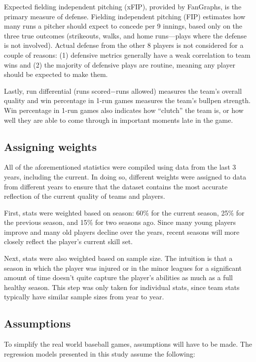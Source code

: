\documentclass{paper}
\begin{document}
Expected fielding independent pitching (xFIP), provided by FanGraphs, is the primary measure of defense. Fielding independent pitching (FIP) estimates how many runs a pitcher should expect to concede per 9 innings, based only on the three true outcomes (strikeouts, walks, and home runs---plays where the defense is not involved). Actual defense from the other 8 players is not considered for a couple of reasons: (1) defensive metrics generally have a weak correlation to team wins and (2) the majority of defensive plays are routine, meaning any player should be expected to make them.

Lastly, run differential (runs scored$-$runs allowed) measures the team's overall quality and win percentage in 1-run games measures the team's bullpen strength. Win percentage in 1-run games also indicates how ``clutch'' the team is, or how well they are able to come through in important moments late in the game.

\subsection{Assigning weights}
All of the aforementioned statistics were compiled using data from the last 3 years, including the current. In doing so, different weights were assigned to data from different years to ensure that the dataset contains the most accurate reflection of the current quality of teams and players.

First, stats were weighted based on season: 60\% for the current season, 25\% for the previous season, and 15\% for two seasons ago. Since many young players improve and many old players decline over the years, recent seasons will more closely reflect the player's current skill set.

Next, stats were also weighted based on sample size. The intuition is that a season in which the player was injured or in the minor leagues for a significant amount of time doesn't quite capture the player's abilities as much as a full healthy season. This step was only taken for individual stats, since team stats typically have similar sample sizes from year to year.

\subsection{Assumptions}
To simplify the real world baseball games, assumptions will have to be made. The regression models presented in this study assume the following:
\end{document}
